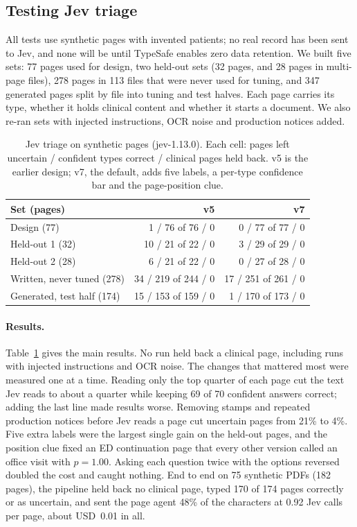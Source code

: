 \subsection{Testing Jev triage}
\label{sec:jev-testing}
All tests use synthetic pages with invented patients; no real record has
been sent to Jev, and none will be until TypeSafe enables zero data
retention. We built five sets: 77 pages used for design, two held-out sets
(32 pages, and 28 pages in multi-page files), 278 pages in 113 files that
were never used for tuning, and 347 generated pages split by file into
tuning and test halves. Each page carries its type, whether it holds
clinical content and whether it starts a document. We also re-ran sets
with injected instructions, OCR noise and production notices added.

\begin{table}[t]
  \caption{Jev triage on synthetic pages (jev-1.13.0). Each cell: pages
    left uncertain / confident types correct / clinical pages held back.
    v5 is the earlier design; v7, the default, adds five labels, a per-type
    confidence bar and the page-position clue.}
  \label{tab:jev-results}
  \small
  \begin{tabular}{@{}lrr@{}}
    \toprule
    Set (pages) & v5 & v7 \\
    \midrule
    Design (77) & 1 / 76 of 76 / 0 & 0 / 77 of 77 / 0 \\
    Held-out 1 (32) & 10 / 21 of 22 / 0 & 3 / 29 of 29 / 0 \\
    Held-out 2 (28) & 6 / 21 of 22 / 0 & 0 / 27 of 28 / 0 \\
    Written, never tuned (278) & 34 / 219 of 244 / 0 & 17 / 251 of 261 / 0 \\
    Generated, test half (174) & 15 / 153 of 159 / 0 & 1 / 170 of 173 / 0 \\
    \bottomrule
  \end{tabular}
\end{table}

\paragraph{Results.} Table~\ref{tab:jev-results} gives the main results.
No run held back a clinical page, including runs with injected
instructions and OCR noise. The changes that mattered most were measured
one at a time. Reading only the top quarter of each page cut the text Jev
reads to about a quarter while keeping 69 of 70 confident answers correct;
adding the last line made results worse. Removing stamps and repeated
production notices before Jev reads a page cut uncertain pages from 21\%
to 4\%. Five extra labels were the largest single gain on the held-out
pages, and the position clue fixed an ED continuation page that every
other version called an office visit with $p=1.00$. Asking each question
twice with the options reversed doubled the cost and caught nothing.
End to end on 75 synthetic PDFs (182 pages), the pipeline held back no
clinical page, typed 170 of 174 pages correctly or as uncertain, and sent
the page agent 48\% of the characters at 0.92 Jev calls per page, about
USD~0.01 in all.

